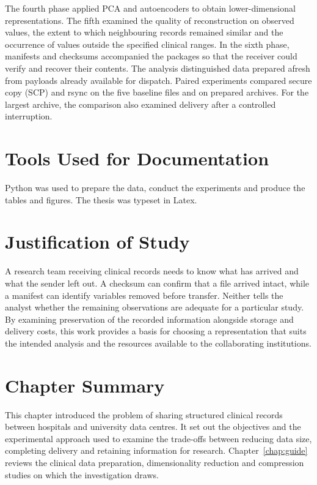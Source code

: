 \noindent The fourth phase applied PCA and autoencoders to obtain lower-dimensional representations. The fifth examined the quality of reconstruction on observed values, the extent to which neighbouring records remained similar and the occurrence of values outside the specified clinical ranges. In the sixth phase, manifests and checksums accompanied the packages so that the receiver could verify and recover their contents. The analysis distinguished data prepared afresh from payloads already available for dispatch. Paired experiments compared secure copy (SCP) and rsync on the five baseline files and on prepared archives. For the largest archive, the comparison also examined delivery after a controlled interruption.

\section{Tools Used for Documentation}
\noindent Python was used to prepare the data, conduct the experiments and produce the tables and figures. The thesis was typeset in Latex.

\section{Justification of Study}\label{Justification of Study}
\noindent A research team receiving clinical records needs to know what has arrived and what the sender left out. A checksum can confirm that a file arrived intact, while a manifest can identify variables removed before transfer. Neither tells the analyst whether the remaining observations are adequate for a particular study. By examining preservation of the recorded information alongside storage and delivery costs, this work provides a basis for choosing a representation that suits the intended analysis and the resources available to the collaborating institutions.

\section{Chapter Summary}\label{Chapter Summary}
\noindent This chapter introduced the problem of sharing structured clinical records between hospitals and university data centres. It set out the objectives and the experimental approach used to examine the trade-offs between reducing data size, completing delivery and retaining information for research. Chapter~\ref{chap:guide} reviews the clinical data preparation, dimensionality reduction and compression studies on which the investigation draws.

